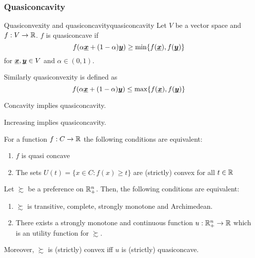 \documentclass[12pt]{extarticle}
\renewcommand{\vec}[1]{\uvec{#1}}
\begin{document}
\subsubsection{Quasiconcavity}

\begin{definition}{Quasiconvexity and quasiconcavity}{quasiconcavity}
    Let $V$ be a vector space and $f: V \to \mathbb{R}$.
    $f$ is quasiconcave if
    \begin{equation}
        f(\alpha \vec x + (1- \alpha) \vec y) \geq \min \{ f(\vec x), f(\vec y) \}
    \end{equation}
    for $\vec x, \vec y \in V$ and $\alpha \in (0,1)$.

    Similarly quasiconvexity is defined as
    \begin{equation}
        f(\alpha \vec x + (1- \alpha) \vec y) \leq \max \{ f(\vec x), f(\vec y) \}
    \end{equation}
\end{definition}

\begin{remark}{}{}
    Concavity implies quasiconcavity.
\end{remark}
\begin{remark}{}{}
    Increasing implies quasiconcavity.
\end{remark}

\begin{proposition}{}{}
    For a function $f: C \to \mathbb{R}$ the following conditions are equivalent:
    \begin{enumerate}[label=\roman*.]
        \item $f$ is quasi concave
        \item The sets $U(t) = \{ x \in C : f(x) \geq t \}$ are (strictly) convex for all $t \in \mathbb{R}$
    \end{enumerate}
\end{proposition}

\begin{theorem}{}{}
    Let $\succsim$ be a preference on $\mathbb{R}^n_+$.
    Then, the following conditions are equivalent:
    \begin{enumerate}[label=\roman*.]
        \item $\succsim$ is transitive, complete, strongly monotone and Archimedean.
        \item There exists a strongly monotone and continuous function $u: \mathbb{R}^n_+ \to \mathbb{R}$ which is an utility function for $\succsim$.
    \end{enumerate}

    Moreover, $\succsim$ is (strictly) convex iff $u$ is (strictly) quasiconcave.
\end{theorem}
\end{document}
